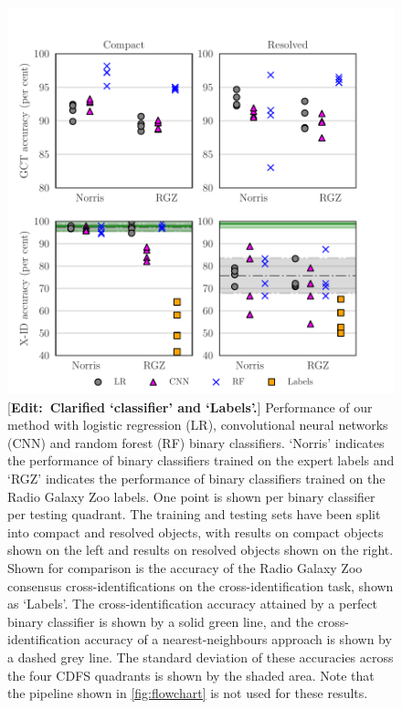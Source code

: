 \documentclass[fleqn,usenatbib,usedcolumn]{mnras}
\newcommand{\edit}[1]{ {\color{red}[{\bf Edit:~{#1}}]} }
\begin{document}
    \begin{figure}
    \centering
    \includegraphics[width=\columnwidth]{images/cdfs-grid-new.pdf}
    \caption{\edit{Clarified `classifier' and `Labels'.} Performance of our method with logistic regression (LR), convolutional neural networks (CNN) and random forest (RF) binary classifiers. `Norris' indicates the performance of binary classifiers trained on the expert labels and `RGZ' indicates the performance of binary classifiers trained on the Radio Galaxy Zoo labels. One point is shown per binary classifier per testing quadrant. The training and testing sets have been split into compact and resolved objects, with results on compact objects shown on the left and results on resolved objects shown on the right. Shown for comparison is the accuracy of the Radio Galaxy Zoo consensus cross-identifications on the cross-identification task, shown as `Labels'. The cross-identification accuracy attained by a perfect binary classifier is shown by a solid green line, and the cross-identification accuracy of a nearest-neighbours approach is shown by a dashed grey line. The standard deviation of these accuracies across the four CDFS quadrants is shown by the shaded area. Note that the pipeline shown in \autoref{fig:flowchart} is not used for these results. \label{fig:ba}}
    \end{figure}
\end{document}
